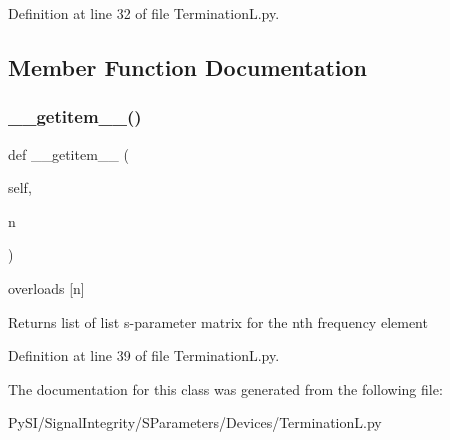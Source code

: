 Definition at line 32 of file Termination\+L.\+py.



\subsection{Member Function Documentation}
\mbox{\label{classSignalIntegrity_1_1SParameters_1_1Devices_1_1TerminationL_1_1TerminationL_ab7a6da5139e0878b590d68292aaa70f2}} 
\subsubsection{\texorpdfstring{\+\_\+\+\_\+getitem\+\_\+\+\_\+()}{\_\_getitem\_\_()}}
{\footnotesize\ttfamily def \+\_\+\+\_\+getitem\+\_\+\+\_\+ (\begin{DoxyParamCaption}\item[{}]{self,  }\item[{}]{n }\end{DoxyParamCaption})}



overloads \mbox{[}n\mbox{]} 

\begin{DoxyReturn}{Returns}
list of list s-\/parameter matrix for the nth frequency element 
\end{DoxyReturn}


Definition at line 39 of file Termination\+L.\+py.



The documentation for this class was generated from the following file\+:\begin{DoxyCompactItemize}
\item 
Py\+S\+I/\+Signal\+Integrity/\+S\+Parameters/\+Devices/Termination\+L.\+py\end{DoxyCompactItemize}
